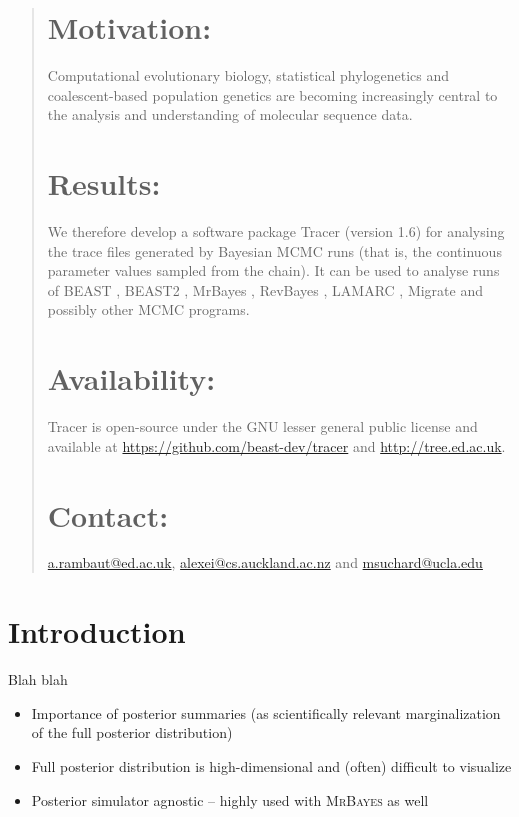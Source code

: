 \documentclass{bioinfo}
\begin{document}
\begin{abstract}

\section{Motivation:}
Computational evolutionary biology, statistical phylogenetics and coalescent-based population genetics are becoming increasingly central to the analysis and understanding of molecular sequence data. 
\section{Results:}
We therefore develop a software package Tracer (version 1.6) for analysing the trace files generated by Bayesian MCMC runs (that is, the continuous parameter values sampled from the chain). It can be used to analyse runs of BEAST \citep{drummond2007beast,drummond2012bayesian}, BEAST2 \citep{bouckaert2014beast2}, MrBayes \citep{ronquist2012mrbayes}, RevBayes \citep{hohna2016revbayes}, LAMARC \citep{kuhner2006lamarc}, Migrate \citep{beerli2006comparison} and possibly other MCMC programs.

\section{Availability:}
Tracer is open-source under the GNU lesser general public license and available at 
\url{https://github.com/beast-dev/tracer} 
and  \href{http://tree.ed.ac.uk/software/tracer}{\url{http://tree.ed.ac.uk}}.

\section{Contact:} 
\href{a.rambaut@ed.ac.uk}{\url{a.rambaut@ed.ac.uk}}, 
\href{alexei@cs.auckland.ac.nz}{\url{alexei@cs.auckland.ac.nz}}
and 
\href{msuchard@ucla.edu}{\url{msuchard@ucla.edu}}

\end{abstract}

\section*{Introduction}

Blah blah 

\begin{itemize}
\item Importance of posterior summaries (as scientifically relevant marginalization of the full posterior distribution)
\item Full posterior distribution is high-dimensional and (often) difficult to visualize
\item Posterior simulator agnostic -- highly used with \textsc{MrBayes} as well
\end{itemize}
\end{document}
